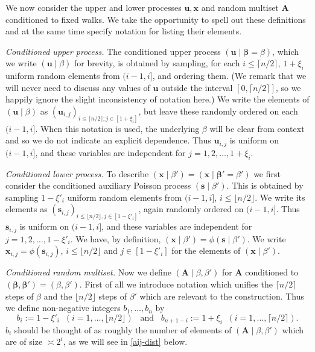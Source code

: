 \documentclass[11pt,reqno]{amsart}
\numberwithin{equation}{section}
\theoremstyle{definition}
\theoremstyle{remark}
\newcommand{\mbf}{\mathbf}
\def\boldbeta{\boldsymbol\beta}
\renewcommand{\le}{\leqslant}
\begin{document}
We now consider the upper and lower processes $\mbf{u}, \mbf{x}$ and random multiset $\mbf{A}$ conditioned to fixed walks. We take the opportunity to spell out these definitions and at the same time specify notation for listing their elements.\vspace*{8pt}


\emph{Conditioned upper process.} The conditioned upper process $(\mbf{u} \mid \boldbeta = \beta)$, which we write $(\mbf{u} \mid \beta)$ for brevity, is obtained by sampling, for each $i \le \lceil n/2\rceil$, $1 + \xi_i$ uniform random elements from $(i-1,i]$, and ordering them. (We remark that we will never need to discuss any values of $\mbf{u}$ outside the interval $[0, \lceil n/2\rceil]$, so we happily ignore the slight inconsistency of notation here.) We write the elements of $(\mbf{u} \mid \beta)$ as $(\mbf{u}_{i,j})_{i \le \lceil n/2\rceil; j \in [1 + \xi_i]}$, but leave these randomly ordered on each $(i-1, i]$. When this notation is used, the underlying $\beta$ will be clear from context and so we do not indicate an explicit dependence. Thus $\mbf{u}_{i,j}$ is uniform on $(i-1,i]$, and these variables are independent for $j = 1,2,\dots, 1 + \xi_i$. \vspace*{8pt}

\emph{Conditioned lower process.} To describe $(\mbf{x} \mid  \beta') = (\mbf{x} \mid \boldbeta' = \beta')$ we first consider the conditioned auxiliary Poisson process $(\mbf{s} \mid \beta')$. This is obtained by sampling $1 - \xi'_i$ uniform random elements from $(i-1,i]$, $i \le \lfloor n/2\rfloor$. We write its elements as $(\mbf{s}_{i,j})_{i \le \lfloor n/2\rfloor, j \in [1 - \xi'_i]}$, again randomly ordered on $(i-1, i]$. Thus $\mbf{s}_{i,j}$ is uniform on $(i-1,i]$, and these variables are independent for $j = 1,2,\dots, 1 - \xi'_i$. We have, by definition, $(\mbf{x} \mid \beta') = \phi(\mbf{s} \mid \beta')$. We write $\mbf{x}_{i,j} = \phi(\mbf{s}_{i,j})$, $i \le \lfloor n/2\rfloor$ and $j \in [1 - \xi'_i]$ for the elements of $(\mbf{x} \mid \beta')$. \vspace*{8pt}

\emph{Conditioned random multiset.} Now we define $(\mbf{A} \mid \beta,\beta')$ for $\mbf{A}$ conditioned to $(\boldbeta , \boldbeta') = (\beta,\beta')$. First of all we introduce notation which unifies the $\lceil n/2\rceil$ steps of $\beta$ and the $\lfloor n/2\rfloor$ steps of $\beta'$ which are relevant to the construction. Thus we define non-negative integers $b_1,\dots, b_n$ by  \begin{equation}\label{bi-defs} b_{i} := 1 - \xi'_i \; \;  (i = 1,\dots, \lfloor n/2\rfloor) \;\;\; \mbox{and}\;\;\;  b_{n + 1 - i} := 1 + \xi_i \; \; (i = 1,\dots, \lceil n/2\rceil).\end{equation}
$b_i$ should be thought of as roughly the number of elements of $(\mbf{A} \mid \beta,\beta')$ which are of size $\asymp 2^{i}$, as we will see in \cref{aij-dist} below.
\end{document}
